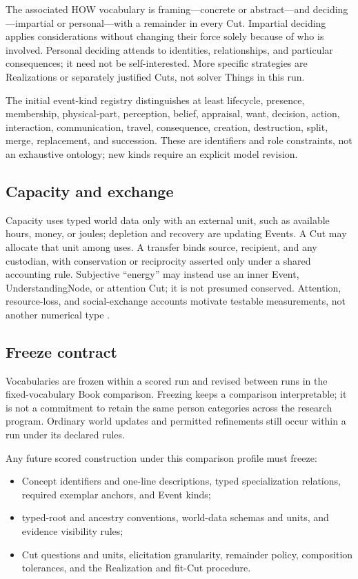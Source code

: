 \documentclass[11pt,a4paper]{article}
\begin{document}
The associated HOW vocabulary is framing---concrete or abstract---and
deciding---impartial or personal---with a remainder in every Cut. Impartial
deciding applies considerations without changing their force solely because of
who is involved. Personal deciding attends to identities, relationships, and
particular consequences; it need not be self-interested. More specific strategies
are Realizations or separately justified Cuts, not solver Things in this run.

The initial event-kind registry distinguishes at least lifecycle, presence,
membership, physical-part, perception, belief, appraisal, want, decision,
action, interaction, communication, travel, consequence, creation,
destruction, split, merge, replacement, and succession. These are identifiers
and role constraints, not an exhaustive ontology; new kinds require an explicit
model revision.

\subsection{Capacity and exchange}

Capacity uses typed world data only with an external unit, such as available
hours, money, or joules; depletion and recovery are updating Events. A Cut may
allocate that unit among uses. A transfer binds source, recipient, and any
custodian, with conservation or reciprocity asserted only under a shared
accounting rule. Subjective ``energy'' may instead use an inner Event,
UnderstandingNode, or attention Cut; it is not presumed conserved. Attention,
resource-loss, and social-exchange accounts motivate testable measurements,
not another numerical type
\cite{kahneman1973attentionEffort,hobfoll1989conservation,
emerson1976socialExchange}.

\subsection{Freeze contract}

Vocabularies are frozen within a scored run and revised between runs in the
fixed-vocabulary Book comparison. Freezing
keeps a comparison interpretable; it is not a commitment to retain the same
person categories across the research program. Ordinary world updates and
permitted refinements still occur within a run under its declared rules.

Any future scored construction under this comparison profile must freeze:
\begin{itemize}
  \item Concept identifiers and one-line descriptions, typed specialization
    relations, required exemplar anchors, and Event kinds;
  \item typed-root and ancestry conventions, world-data schemas and units,
    and evidence visibility rules;
  \item Cut questions and units, elicitation granularity, remainder policy,
    composition tolerances, and the Realization and fit-Cut procedure.
\end{itemize}
\end{document}
